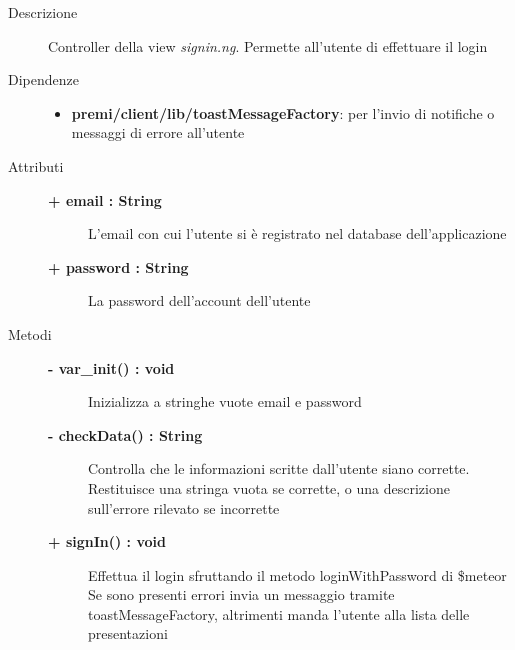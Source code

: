 \begin{description}
\item[Descrizione] \hfill
	Controller della view \textit{signin.ng}. Permette all'utente di effettuare il login
	
	
	
\item[Dipendenze] \hfill
	\begin{itemize}
		\item \textbf{premi/client/lib/toastMessageFactory}: per l'invio di notifiche o messaggi di errore all'utente
	\end{itemize}
	
	
\item[Attributi] \hfill
	\begin{description}
		\item[\textbf{+ email : String			}] \hfill
			L'email con cui l'utente si è registrato nel database dell'applicazione
		\item[\textbf{+ password : String			}] \hfill
			La password dell'account dell'utente
	\end{description}
	
	
\item[Metodi] \hfill

	\begin{description}
		\item[\textbf{\color{blue}- var\_init() : void			}] \hfill
			Inizializza a stringhe vuote email e password
	\end{description}
	
	\begin{description}
		\item[\textbf{\color{blue}- checkData() : String			}] \hfill
			Controlla che le informazioni scritte dall'utente siano corrette. Restituisce una stringa vuota se corrette, o una descrizione sull'errore rilevato se incorrette
	\end{description}
	
	\begin{description}
		\item[\textbf{\color{blue}+ signIn() : void			}] \hfill
			Effettua il login sfruttando il metodo loginWithPassword di \$meteor
			Se sono presenti errori invia un messaggio tramite toastMessageFactory, altrimenti manda l'utente alla lista delle presentazioni
	\end{description}

\end{description}



